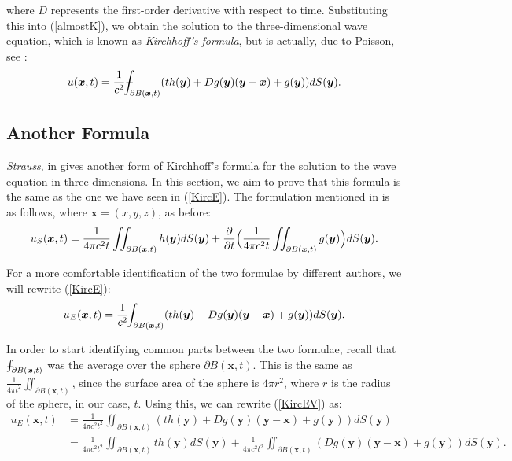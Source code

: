 \documentclass[a4paper, 12pt]{article}
\def\Xint#1{\mathchoice
{\XXint\displaystyle\textstyle{#1}}%
{\XXint\textstyle\scriptstyle{#1}}%
{\XXint\scriptstyle\scriptscriptstyle{#1}}%
{\XXint\scriptscriptstyle\scriptscriptstyle{#1}}%
\!\int}
\def\XXint#1#2#3{{\setbox0=\hbox{$#1{#2#3}{\int}$ }
\vcenter{\hbox{$#2#3$ }}\kern-.6\wd0}}
\def\dashint{\Xint-}
\numberwithin{equation}{section}
\begin{document}
where $D$ represents the first-order derivative with respect to time.
Substituting this into (\ref{almostK}), we obtain the solution to the
three-dimensional wave equation, which is known as \emph{Kirchhoff's formula},
but is actually, due to Poisson, see \cite[Ch. 9.2]{Str}:
\begin{equation} \label{KircE}
    u(\boldsymbol{x},t)=\frac{1}{c^2}\dashint_{\partial B(\boldsymbol{x},t)} (th(\boldsymbol{y})+Dg(\boldsymbol{y})(\boldsymbol{y}-\boldsymbol{x})+g(\boldsymbol{y}))dS(\boldsymbol{y}).
\end{equation}

\subsection{Another Formula}
\emph{Strauss}, in \cite[Ch. 9.2]{Str} gives another form of Kirchhoff's formula for the
solution to the wave equation in three-dimensions. In this section, we aim to
prove that this formula is the same as the one we have seen in (\ref{KircE}).
The formulation mentioned in \cite[Ch. 9.2]{Str} is as follows, where
$\boldsymbol{x}=(x,y,z)$, as before:
\begin{equation} \label{KircSTR}
    u_S(\boldsymbol{x}, t)=\frac{1}{4 \pi c^2 t}\iint_{\partial B(\boldsymbol{x}, t)}h(\boldsymbol{y})dS(\boldsymbol{y})+\diffp[1]{}{t}\Big( \frac{1}{4 \pi c^2 t}\iint_{\partial B(\boldsymbol{x}, t)} g(\boldsymbol{y})\Big)dS(\boldsymbol{y}).
\end{equation}

For a more comfortable identification of the two formulae by different authors,
we will rewrite (\ref{KircE}): 
\begin{equation} \label{KircEV}
    u_E(\boldsymbol{x},t)=\frac{1}{c^2}\dashint_{\partial B(\boldsymbol{x},t)}(th(\boldsymbol{y})+Dg(\boldsymbol{y})(\boldsymbol{y}-\boldsymbol{x})+g(\boldsymbol{y}))dS(\boldsymbol{y}).
\end{equation}

In order to start identifying common parts between the two formulae, recall that
$\dashint_{\partial B(\boldsymbol{x}, t)}$ was the average over the sphere
$\partial B(\boldsymbol{x}, t)$. This is the same as $\frac{1}{4 \pi
t^2}\iint_{\partial B(\boldsymbol{x}, t)}$, since the surface area of the sphere
is $4\pi r^2$, where $r$ is the radius of the sphere, in our case, $t$. Using
this, we can rewrite (\ref{KircEV}) as:
\begin{equation*}
    \begin{aligned}
    u_E(\boldsymbol{x},t)&=\frac{1}{4 \pi c^2 t^2}\iint_{\partial B(\boldsymbol{x},t)} (th(\boldsymbol{y})+Dg(\boldsymbol{y})(\boldsymbol{y}-\boldsymbol{x})+g(\boldsymbol{y}))dS(\boldsymbol{y})\\ 
    &=\frac{1}{4 \pi c^2 t^2}\iint_{\partial B(\boldsymbol{x},t)} th(\boldsymbol{y})dS(\boldsymbol{y})+\frac{1}{4 \pi c^2 t^2}\iint_{\partial B(\boldsymbol{x},t)}(Dg(\boldsymbol{y})(\boldsymbol{y}-\boldsymbol{x})+g(\boldsymbol{y}))dS(\boldsymbol{y}).
    \end{aligned}
\end{equation*}
\end{document}
